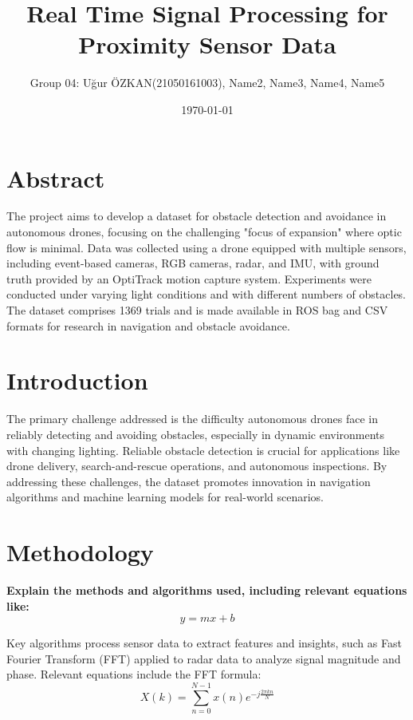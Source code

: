 \documentclass[12pt,a4paper]{article}
\title{Real Time Signal Processing for Proximity Sensor Data}
\author{Group 04: Uğur ÖZKAN(21050161003), Name2, Name3, Name4, Name5}
\date{\today}
\begin{document}
\maketitle
\section{Abstract}

The project aims to develop a dataset for obstacle detection and avoidance in autonomous drones, focusing on the challenging "focus of expansion" where optic flow is minimal. Data was collected using a drone equipped with multiple sensors, including event-based cameras, RGB cameras, radar, and IMU, with ground truth provided by an OptiTrack motion capture system. Experiments were conducted under varying light conditions and with different numbers of obstacles. The dataset comprises 1369 trials and is made available in ROS bag and CSV formats for research in navigation and obstacle avoidance.

\section{Introduction}

The primary challenge addressed is the difficulty autonomous drones face in reliably detecting and avoiding obstacles, especially in dynamic environments with changing lighting. Reliable obstacle detection is crucial for applications like drone delivery, search-and-rescue operations, and autonomous inspections. By addressing these challenges, the dataset promotes innovation in navigation algorithms and machine learning models for real-world scenarios.

\section{Methodology}
\textbf{Explain the methods and algorithms used, including relevant equations like:}
\begin{equation}
    y = mx + b
\end{equation}

Key algorithms process sensor data to extract features and insights, such as Fast Fourier Transform (FFT) applied to radar data to analyze signal magnitude and phase. Relevant equations include the FFT formula:
\begin{equation}
X(k) = \sum_{n=0}^{N-1} x(n) e^{-j\frac{2\pi k n}{N}}
\end{equation} 
\end{document}
